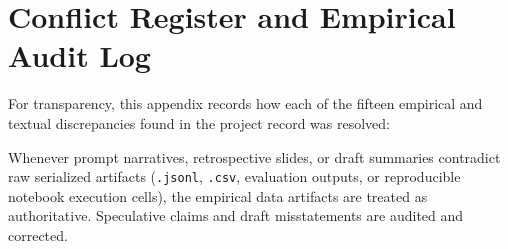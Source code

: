 \clearpage
\chapter{Conflict Register and Empirical Audit Log}
\label{app:conflicts}

For transparency, this appendix records how each of the fifteen empirical and textual discrepancies found in the project record was resolved:

\begin{keypoint}
Whenever prompt narratives, retrospective slides, or draft summaries contradict raw serialized artifacts (\texttt{.jsonl}, \texttt{.csv}, evaluation outputs, or reproducible notebook execution cells), the empirical data artifacts are treated as authoritative. Speculative claims and draft misstatements are audited and corrected.
\end{keypoint}

